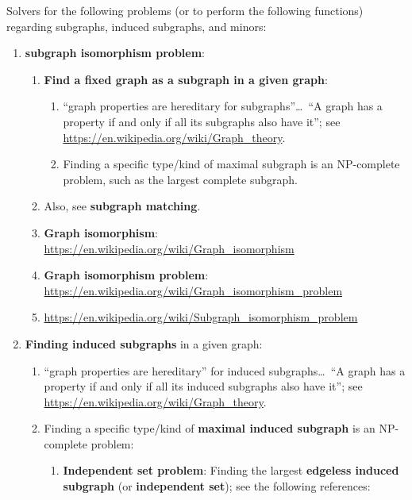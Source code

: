Solvers for the following problems (or to perform the following functions) regarding subgraphs, induced subgraphs, and minors: \vspace{-0.3cm}
\begin{enumerate} \itemsep -4pt
\item {\bf subgraph isomorphism problem}: \vspace{-0.3cm}
	\begin{enumerate} \itemsep -2pt
	\item {\bf Find a fixed graph as a subgraph in a given graph}: \vspace{-0.2cm}
		\begin{enumerate} \itemsep -2pt
		\item ``graph properties are hereditary for subgraphs''\dots\ ``A graph has a property if and only if all its subgraphs also have it''; see \url{https://en.wikipedia.org/wiki/Graph_theory}.
		\item Finding a specific type/kind of maximal subgraph is an NP-complete problem, such as the largest complete subgraph.
		\end{enumerate}
	\item Also, see {\bf subgraph matching}.
	\item {\bf Graph isomorphism}: \url{https://en.wikipedia.org/wiki/Graph_isomorphism}
	\item {\bf Graph isomorphism problem}: \url{https://en.wikipedia.org/wiki/Graph_isomorphism_problem}
	\item \url{https://en.wikipedia.org/wiki/Subgraph_isomorphism_problem}
	\end{enumerate}
\item {\bf Finding induced subgraphs} in a given graph: \vspace{-0.3cm}
	\begin{enumerate} \itemsep -2pt
	\item ``graph properties are hereditary'' for induced subgraphs\dots\ ``A graph has a property if and only if all its induced subgraphs also have it''; see \url{https://en.wikipedia.org/wiki/Graph_theory}.
	\item Finding a specific type/kind of {\bf maximal induced subgraph} is an NP-complete problem: \vspace{-0.2cm}
		\begin{enumerate} \itemsep -2pt
		\item {\bf Independent set problem}: Finding the largest {\bf edgeless induced subgraph} (or {\bf independent set}); see the following references: \vspace{-0.1cm}

\end{enumerate}
\end{enumerate}
\end{enumerate}
